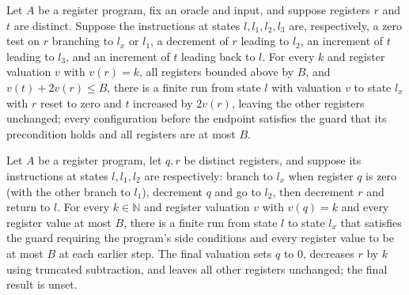 \begin{theorem}
\label{Complexity.LogProg.dmove_run}
\leanok
{}
Let $A$ be a register program, fix an oracle and input, and suppose registers $r$ and
$t$ are distinct. Suppose the instructions at states $l,l_1,l_2,l_3$ are, respectively,
a zero test on $r$ branching to $l_x$ or $l_1$, a decrement of $r$ leading to $l_2$, an
increment of $t$ leading to $l_3$, and an increment of $t$ leading back to $l$. For
every $k$ and register valuation $v$ with $v(r)=k$, all registers bounded above by $B$,
and $v(t)+2v(r)\le B$, there is a finite run from state $l$ with valuation $v$ to state
$l_x$ with $r$ reset to zero and $t$ increased by $2v(r)$, leaving the other registers
unchanged; every configuration before the endpoint satisfies the guard that its
precondition holds and all registers are at most $B$.
\end{theorem}

\begin{theorem}
\label{Complexity.LogProg.sub_run}
\leanok
{}
Let $A$ be a register program, let $q,r$ be distinct registers, and suppose its
instructions at states $l,l_1,l_2$ are respectively: branch to $l_x$ when register $q$
is zero (with the other branch to $l_1$), decrement $q$ and go to $l_2$, then decrement
$r$ and return to $l$. For every $k\in\mathbb N$ and register valuation $v$ with
$v(q)=k$ and every register value at most $B$, there is a finite run from state $l$ to
state $l_x$ that satisfies the guard requiring the program's side conditions and every
register value to be at most $B$ at each earlier step. The final valuation sets $q$ to
$0$, decreases $r$ by $k$ using truncated subtraction, and leaves all other registers
unchanged; the final result is unset.
\end{theorem}


